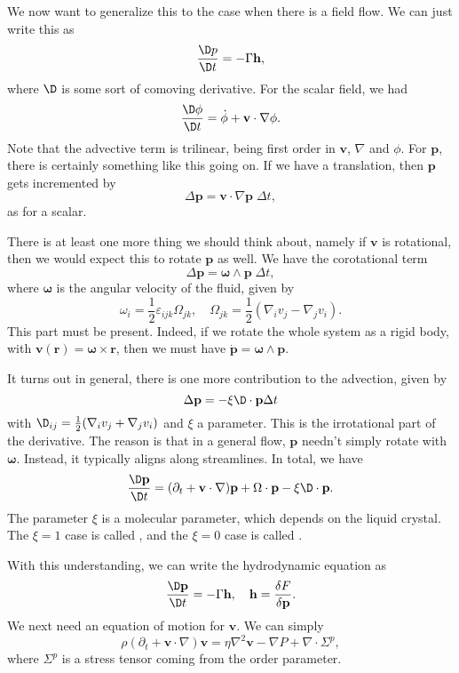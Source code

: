 \documentclass[a4paper]{article}
\begin{document}
We now want to generalize this to the case when there is a field flow. We can just write this as
\[
  \frac{\D p}{\D t} = - \Gamma \mathbf{h},
\]
where $\D$ is some sort of comoving derivative. For the scalar field, we had
\[
  \frac{\D \phi}{\D t} = \dot{\phi} + \mathbf{v} \cdot \nabla \phi.
\]
Note that the advective term is trilinear, being first order in $\mathbf{v}$, $\nabla$ and $\phi$. For $\mathbf{p}$, there is certainly something like this going on. If we have a translation, then $\mathbf{p}$ gets incremented by
\[
  \Delta \mathbf{p} = \mathbf{v} \cdot \nabla \mathbf{p}\;\Delta t,
\]
as for a scalar.

There is at least one more thing we should think about, namely if $\mathbf{v}$ is rotational, then we would expect this to rotate $\mathbf{p}$ as well. We have the corotational term
\[
  \Delta \mathbf{p} = \boldsymbol\omega \wedge \mathbf{p}\;\Delta t,
\]
where $\boldsymbol\omega$ is the angular velocity of the fluid, given by
\[
  \omega_i = \frac{1}{2} \varepsilon_{ijk} \Omega_{jk},\quad \Omega_{jk} = \frac{1}{2} (\nabla_i v_j - \nabla_j v_i).
\]
This part must be present. Indeed, if we rotate the whole system as a rigid body, with $\mathbf{v}(\mathbf{r}) = \boldsymbol\omega \times \mathbf{r}$, then we must have $\dot{\mathbf{p}} = \boldsymbol\omega \wedge \mathbf{p}$.

It turns out in general, there is one more contribution to the advection, given by
\[
  \Delta \mathbf{p} = - \xi \D \cdot \mathbf{p} \Delta t
\]
with $\D_{ij} = \frac{1}{2} (\nabla_i v_j + \nabla_j v_i)$ and $\xi$ a parameter. This is the irrotational part of the derivative. The reason is that in a general flow, $\mathbf{p}$ needn't simply rotate with $\boldsymbol\omega$. Instead, it typically aligns along streamlines. In total, we have
\[
  \frac{\D \mathbf{p}}{\D t} = (\partial_t + \mathbf{v} \cdot \nabla) \mathbf{p} + \Omega \cdot \mathbf{p} - \xi \D \cdot \mathbf{p}.
\]
The parameter $\xi$ is a molecular parameter, which depends on the liquid crystal. The $\xi = 1$ case is called , and the $\xi = 0$ case is called .

With this understanding, we can write the hydrodynamic equation as
\[
  \frac{\D \mathbf{p}}{\D t} = - \Gamma \mathbf{h},\quad \mathbf{h} = \frac{\delta F}{\delta \mathbf{p}}.
\]
We next need an equation of motion for $\mathbf{v}$. We can simply
\[
  \rho(\partial_t +\mathbf{v} \cdot \nabla) \mathbf{v} = \eta \nabla^2 \mathbf{v} - \nabla P + \nabla \cdot \Sigma^p,
\]
where $\Sigma^p$ is a stress tensor coming from the order parameter.
\end{document}

